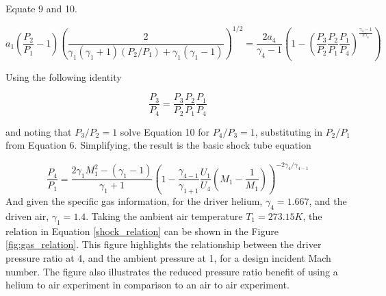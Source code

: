 Equate 9 and 10.

\begin{equation}
a_1\left(\frac{P_2}{P_1} - 1\right)\left(\frac{2}{\gamma_1(\gamma_1 + 1)(P_2/P_1) + \gamma_1(\gamma_1 - 1)}\right)^{1/2} = \frac{2a_4}{\gamma_4 - 1}\left(1 - \left(\frac{P_3}{P_2}\frac{P_2}{P_1}\frac{P_1}{P_4}\right)^{\frac{\gamma_4 - 1}{2\gamma_4}}\right)
\end{equation}

Using the following identity

\begin{equation}
\frac{P_3}{P_4}=\frac{P_3}{P_2}\frac{P_2}{P_1}\frac{P_1}{P_4}
\end{equation}

and noting that $P_3/P_2 = 1$ solve Equation 10 for $P_4/P_3 = 1$, substituting in $P_2/P_1$ from Equation 6. Simplifying, the result is the basic shock tube equation

\begin{equation} \label{shock_relation}
\frac{P_4}{P_1} = \frac{2\gamma_1M_1^2 - (\gamma_1 - 1)}{\gamma_1 + 1}\left(1 - \frac{\gamma_{4-1}}{\gamma_{1+1}}\frac{U_1}{U_4}\left(M_1 - \frac{1}{M_1}\right)\right)^{-2\gamma_4/\gamma_{4-1}}
\end{equation}
And given the specific gas information, for the driver helium, $\gamma_4 = 1.667$, and the driven air, $\gamma_1 = 1.4$. Taking the ambient air temperature $T_1 = 273.15K$, the relation in Equation \ref{shock_relation} can be shown in the Figure \ref{fig:gas_relation}. This figure highlights the relationship between the driver pressure ratio at 4, and the ambient pressure at 1, for a design incident Mach number. The figure also illustrates the reduced pressure ratio benefit of using a helium to air experiment in comparison to an air to air experiment. 
	


